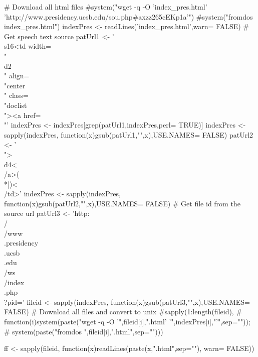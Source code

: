 \documentclass{article}
\begin{document}
# Download all html files
#system("wget -q -O 'index_pres.html' 'http://www.presidency.ucsb.edu/sou.php#axzz265cEKp1a'")
#system("fromdos index_pres.html")
indexPres <- readLines('index_pres.html',warn= FALSE)
# Get speech text source
patUrl1 <- '\\s{16}<td width=\\"\\d{2}\\" align=\\"center\\" class=\\"doclist\\"><a href=\\"'
indexPres <- indexPres[grep(patUrl1,indexPres,perl= TRUE)]
indexPres <- sapply(indexPres, function(x){gsub(patUrl1,"",x)},USE.NAMES= FALSE)
patUrl2 <- '\\">\\d{4}<\\/a>(\\*|)<\\/td>'
indexPres <- sapply(indexPres, function(x){gsub(patUrl2,"",x)},USE.NAMES= FALSE)
# Get file id from the source url
patUrl3 <- 'http:\\/\\/www\\.presidency\\.ucsb\\.edu\\/ws\\/index\\.php\\?pid='
fileid <- sapply(indexPres, function(x){gsub(patUrl3,"",x)},USE.NAMES= FALSE)
# Download all files and convert to unix
#sapply(1:length(fileid),
#       function(i){system(paste("wget -q -O '",fileid[i],".html' '",indexPres[i],"'",sep=""));
#                   system(paste("fromdos ",fileid[i],".html",sep=""))})

ff <- sapply(fileid, function(x){readLines(paste(x,".html",sep=""), warn= FALSE)})
\end{document}
